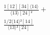 \documentclass[varwidth, border=5pt]{standalone}
\begin{document}
\begin{my}
$\begin{gathered}
\scriptscriptstyle\frac{1[12][34]⟨14⟩}{⟨13⟩[24]²} +\\
\scriptscriptstyle\frac{1/2⟨14⟩²[14]}{⟨13⟩²[24]} \phantom{+}
\end{gathered}$
\end{my}
\end{document}
